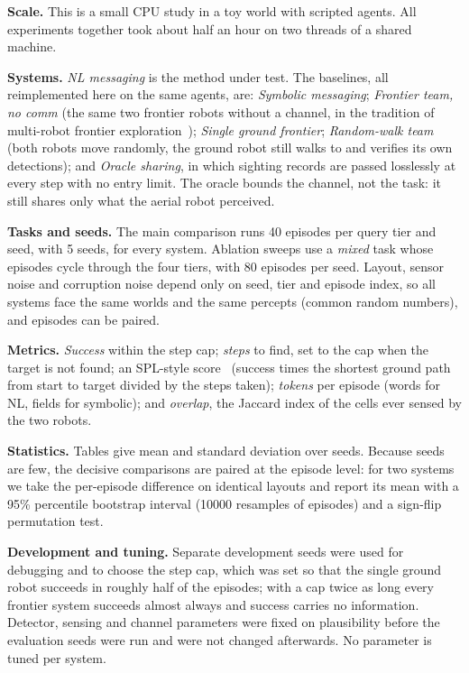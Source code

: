 \textbf{Scale.} This is a small CPU study in a toy world with scripted agents. All experiments together took about half an hour on two threads of a shared machine.

\textbf{Systems.} \emph{NL messaging} is the method under test. The baselines, all reimplemented here on the same agents, are: \emph{Symbolic messaging}; \emph{Frontier team, no comm} (the same two frontier robots without a channel, in the tradition of multi-robot frontier exploration~\cite{xu2022explore}); \emph{Single ground frontier}; \emph{Random-walk team} (both robots move randomly, the ground robot still walks to and verifies its own detections); and \emph{Oracle sharing}, in which sighting records are passed losslessly at every step with no entry limit. The oracle bounds the channel, not the task: it still shares only what the aerial robot perceived.

\textbf{Tasks and seeds.} The main comparison runs 40 episodes per query tier and seed, with 5 seeds, for every system. Ablation sweeps use a \emph{mixed} task whose episodes cycle through the four tiers, with 80 episodes per seed. Layout, sensor noise and corruption noise depend only on seed, tier and episode index, so all systems face the same worlds and the same percepts (common random numbers), and episodes can be paired.

\textbf{Metrics.} \emph{Success} within the step cap; \emph{steps} to find, set to the cap when the target is not found; an SPL-style score~\cite{anderson2018evaluation} (success times the shortest ground path from start to target divided by the steps taken); \emph{tokens} per episode (words for NL, fields for symbolic); and \emph{overlap}, the Jaccard index of the cells ever sensed by the two robots.

\textbf{Statistics.} Tables give mean and standard deviation over seeds. Because seeds are few, the decisive comparisons are paired at the episode level: for two systems we take the per-episode difference on identical layouts and report its mean with a 95\% percentile bootstrap interval (10000 resamples of episodes) and a sign-flip permutation test.

\textbf{Development and tuning.} Separate development seeds were used for debugging and to choose the step cap, which was set so that the single ground robot succeeds in roughly half of the episodes; with a cap twice as long every frontier system succeeds almost always and success carries no information. Detector, sensing and channel parameters were fixed on plausibility before the evaluation seeds were run and were not changed afterwards. No parameter is tuned per system.
